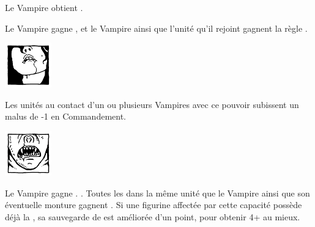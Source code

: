 \begin{multicols}{2}
\startpricelist

 Le Vampire obtient .

 Le Vampire gagne \awaken{\zombies, \direwolves, \batswarms, \greatbats}, et le Vampire ainsi que l'unité qu'il rejoint gagnent la règle \swiftstride{}.

\endpricelist

\begin{center}\includegraphics[width=2cm]{logos/logo_lamia.png}\end{center}
\vspace*{-1.2cm}

\startpricelist

 

 Les unités au contact d'un ou plusieurs Vampires avec ce pouvoir subissent un malus de -1 en Commandement.

\endpricelist

\columnbreak
\begin{center}\includegraphics[width=2cm]{logos/logo_strigoi.png}\end{center}
\vspace*{-1.2cm}

\startpricelist

 Le Vampire gagne . . Toutes les \ghouls{} dans la même unité que le Vampire ainsi que son éventuelle monture gagnent . Si une figurine affectée par cette capacité possède déjà la \regeneration{}, sa sauvegarde de \regeneration{} est améliorée d'un point, pour obtenir 4+ au mieux.


\end{multicols}
